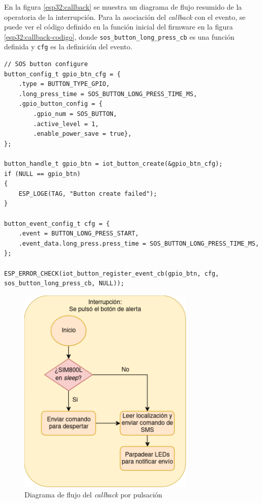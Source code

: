 {En la figura \ref{esp32:callback} se muestra un diagrama de flujo resumido de la operatoria de la interrupción. Para la asociación del \textit{callback} con el evento, se puede ver el código definido en la función inicial del firmware en la figura \ref{esp32:callback-codigo}, donde \texttt{sos\_button\_long\_press\_cb} es una función definida y \texttt{cfg} es la definición del evento.

\begin{lstlisting}[label=esp32:callback-codigo,caption=Definición del evento y asociación del \textit{callback}]  % Start your code-block
// SOS button configure
button_config_t gpio_btn_cfg = {
    .type = BUTTON_TYPE_GPIO,
    .long_press_time = SOS_BUTTON_LONG_PRESS_TIME_MS,
    .gpio_button_config = {
        .gpio_num = SOS_BUTTON,
        .active_level = 1,
        .enable_power_save = true},
};

button_handle_t gpio_btn = iot_button_create(&gpio_btn_cfg);
if (NULL == gpio_btn)
{
    ESP_LOGE(TAG, "Button create failed");
}

button_event_config_t cfg = {
    .event = BUTTON_LONG_PRESS_START,
    .event_data.long_press.press_time = SOS_BUTTON_LONG_PRESS_TIME_MS,
};

ESP_ERROR_CHECK(iot_button_register_event_cb(gpio_btn, cfg, sos_button_long_press_cb, NULL));

\end{lstlisting}

\begin{figure}[H]
	\centering
	\includegraphics[width=0.75\textwidth]{./Figures/esp32-callback.png}
	\caption{Diagrama de flujo del \textit{callback} por pulsación}
	\label{fig:esp32:arquitectura}
\end{figure}


}
